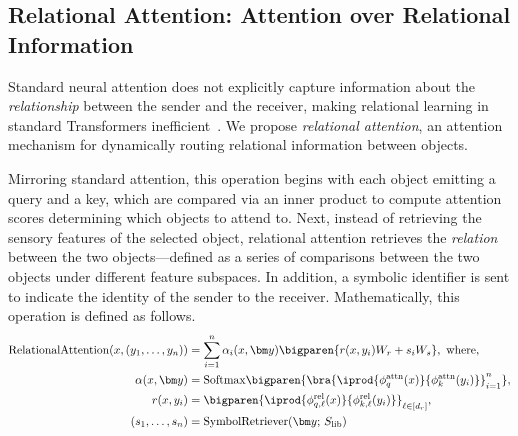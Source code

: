 \subsection{Relational Attention: Attention over Relational Information}

Standard neural attention does not explicitly capture information about the \textit{relationship} between the sender and the receiver, making relational learning in standard Transformers inefficient~\citep{lake2018generalization,barrett2018measuring,santoroSimpleNeuralNetwork2017,santoroRelationalRecurrentNeural2018,shanahanExplicitlyRelationalNeurala,webbEmergentSymbolsBinding2021,webbRelationalBottleneckInductive2024,kergNeuralArchitectureInductive2022,altabaa2024abstractors,altabaaLearningHierarchicalRelational2024}. We propose \textit{relational attention}, an attention mechanism for dynamically routing relational information between objects.

Mirroring standard attention, this operation begins with each object emitting a query and a key, which are compared via an inner product to compute attention scores determining which objects to attend to. Next, instead of retrieving the sensory features of the selected object, relational attention retrieves the \textit{relation} between the two objects---defined as a series of comparisons between the two objects under different feature subspaces. In addition, a symbolic identifier is sent to indicate the identity of the sender to the receiver. Mathematically, this operation is defined as follows.
\begin{equation}\label{eq:rel_attn}
  \begin{split}
    \RelAttn(x, \ys) &= \sum_{i=1}^{n} \alpha_i(x, \y) \bigparen{r(x, y_i) W_r + s_i W_s}, \ \text{where},\\
    \alpha(x, \y) &= \Softmax\bigparen{\bra{\iprod{\phiqattn(x)}{\phikattn(y_i)}}_{i=1}^{n}}, \\
    r(x, y_i) &= \bigparen{\iprod{\phiqrell{\ell}(x)}{\phikrell{\ell}(y_i)}}_{\ell \in [d_r]}, \\
    (s_1, \ldots, s_n) &= \SymbolRetriever(\y;\,\Slib)
  \end{split}
\end{equation}

